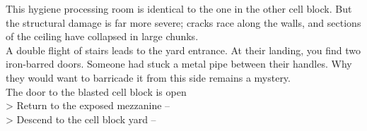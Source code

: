 This hygiene processing room is identical to the one in the other cell block. But the structural damage is far more severe; cracks race along the walls, and sections of the ceiling have collapsed in large chunks.\\

A double flight of stairs leads to the yard entrance. At their landing, you find two iron-barred doors. Someone had stuck a metal pipe between their handles. Why they would want to barricade it from this side remains a mystery.\\
 The door to the blasted cell block is open\\

> Return to the exposed mezzanine -- \\
> Descend to the cell block yard -- 